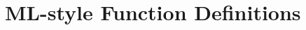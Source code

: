 \begin{comment}
define right := ((Pair 1 'a) :: (Pair 2 'b) :: (Pair 3 'c) :: Nil)

> (!derive (left = right) [zip-def])

Theorem: (= (zip (Cons 1
                       (Cons 2
                             (Cons 3
                                   Nil:(List-Of Int))))
                 (Cons 'a
                       (Cons 'b
                             (Cons 'c
                                   Nil:(List-Of Ide)))))
            (Cons (Pair 1 'a)
                  (Cons (Pair 2 'b)
                        (Cons (Pair 3 'c)
                              Nil:(List-Of (Pair-Of Int Ide))))))
\end{tcAthena}
and so on.

\end{comment}


\section{ML-style Function Definitions}

